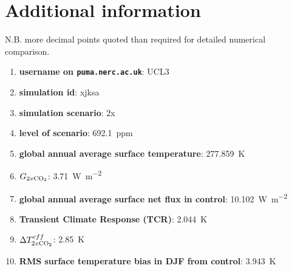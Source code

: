 \documentclass{article}
\begin{document}
\printbibliography
\appendix 

\section{Additional information}

N.B. more decimal points quoted than required for detailed numerical comparison.

\begin{enumerate}
    \item \textbf{username on \texttt{puma.nerc.ac.uk}}: UCL3
    \item \textbf{simulation id}: xjksa
    \item \textbf{simulation scenario}: 2x
    \item \textbf{ level of scenario}: \SI{692.1}{ppm}
    \item \textbf{global annual average surface temperature}: \SI{277.859}{K}
    \item \textbf{$G_{2x\ce{CO2}}$}: \SI{3.71}{W.m^{-2}}
    \item \textbf{global annual average surface net flux in control}: \SI{10.102}{W.m^{-2}}
    \item \textbf{Transient Climate Response (TCR)}: \SI{2.044}{K}
    \item \textbf{$\Delta T^{eff}_{2x\ce{CO2}}$}: \SI{2.85}{K}
    \item \textbf{RMS surface temperature bias in DJF from control}: \SI{3.943}{K} %
\end{enumerate}
\end{document}
